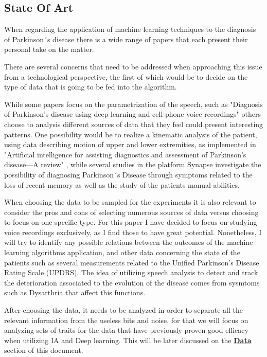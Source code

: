 \documentclass[12pt, a4paper]{article}
\begin{document}
	\subsection{State Of Art}
	
	When regarding the application of machine learning techniques to the diagnosis of Parkinson´s disease there is a wide range of papers that each present their personal take on the matter.
	
	There are several concerns that need to be addressed when approaching this issue from a technological perspective, the first of which would be to decide on the type of data that is going to be fed into the algorithm.
	
	While some papers focus on the parametrization of the speech, such as "Diagnosis of Parkinson's disease using deep learning and cell phone voice recordings" \cite{deeplearningygrabaciones} others choose to analysis different sources of data that they feel could present interesting patterns. One possibility would be to realize a kinematic analysis of the patient, using data describing motion of upper and lower extremities, as implemented in "Artificial intelligence for assisting diagnostics and assessment of Parkinson’s disease—A review" \cite{belic2019artificial}, while several studies in the platform Synapse investigate the possibility of diagnosing Parkinson´s Disease through symptoms related to the loss of recent memory as well as the study of the patients manual abilities.
	
	When choosing the data to be sampled for the experiments it is also relevant to consider the pros and cons of selecting numerous sources of data versus choosing to focus on one specific type. For this paper I have decided to focus on studying voice recordings exclusively, as I find those to have great potential. Nonetheless, I will try to identify any possible relations between the outcomes of the machine learning algorithms application, and other data concerning the state of the patients such as several measurements related to the Unified Parkinson's Disease Rating Scale (UPDRS). The idea of utilizing speech analysis to detect and track the deterioration associated to the evolution of the disease comes from sysmtoms such as Dysarthria that affect this functions. \cite{cnntoformantmeasures}
	
	After choosing the data, it needs to be analyzed in order to separate all the relevant information from the useless bits and noise, for that we will focus on analyzing sets of traits for the data that have previously proven good efficacy when utilizing IA and Deep learning. This will be later discussed on the \hyperref[sec:Data]{\textbf{Data}} section of this document.
	
\end{document}
